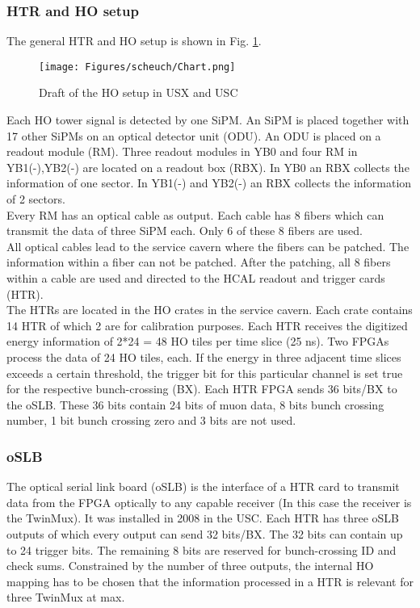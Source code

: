 \subsubsection{HTR and HO setup}
The general HTR and HO setup is shown in Fig. \ref{HOPlan}.\\
\begin{figure}[b]
\centering
\begin{minipage}[t]{0.95\textwidth}
\texttt{[image: Figures/scheuch/Chart.png]}
\caption{Draft of the HO setup in USX and USC}
\label{HOPlan}
\end{minipage}
\end{figure}
Each HO tower signal is detected by one SiPM. An SiPM is placed together with 17 other SiPMs on an optical detector unit (ODU). An ODU is placed on a readout module (RM). Three readout modules in YB0 and four RM in YB1(-),YB2(-) are located on a readout box (RBX). In YB0 an RBX collects the information of one sector. In YB1(-) and YB2(-) an RBX collects the information of 2 sectors.\\
Every RM has an optical cable as output. Each cable has 8 fibers which can transmit the data of three SiPM each. Only 6 of these 8 fibers are used.\\
All optical cables lead to the service cavern where the fibers can be patched. The information within a fiber can not be patched. After the patching, all 8 fibers within a cable are used and directed to the HCAL readout and trigger cards (HTR).\\
The HTRs are located in the HO crates in the service cavern. Each crate contains 14 HTR of which 2 are for calibration purposes. Each HTR receives the digitized energy information of 2*24 = 48 HO tiles per time slice (25 ns). Two FPGAs process the data of 24 HO tiles, each. If the energy in three adjacent time slices exceeds a certain threshold, the trigger bit for this particular channel is set true for the respective bunch-crossing (BX).
Each HTR FPGA sends 36 bits/BX to the oSLB. These 36 bits contain 24 bits of muon data, 8 bits bunch crossing number, 1 bit bunch crossing zero and 3 bits are not used.
\subsubsection{oSLB}
The optical serial link board (oSLB) is the interface of a HTR card to transmit data from the FPGA optically to any capable receiver (In this case the receiver is the TwinMux). It was installed in 2008 in the USC. Each HTR has three oSLB outputs of which every output can send 32 bits/BX. The 32 bits can contain up to 24 trigger bits. The remaining 8 bits are reserved for bunch-crossing ID and check sums. Constrained by the number of three outputs, the internal HO mapping has to be chosen that the information processed in a HTR is relevant for three TwinMux at max.
